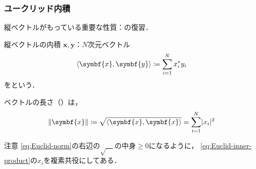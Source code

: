 \documentclass[
    10pt,
    ]{sotsu-beamer}
\begin{document}
\begin{frame}
    \frametitle{ユークリッド内積}

    縦ベクトルがもっている重要な性質：の復習．

    \pause 

    \begin{block}{縦ベクトルの内積}
        $\symbf{x}, \symbf{y}$：$N$次元ベクトル
        \begin{equation}
            \label{eq:Euclid-inner-product}
            \iparen{\symbf{x}, \symbf{y}}
                \coloneq \sum_{i=1}^{N} x_i^* y_i
        \end{equation}
        をという．
    \end{block}

    ベクトルの長さ（）は，
    \begin{equation}
        \label{eq:Euclid-norm}
        \norm{\symbf{x}} \coloneq \sqrt{\iparen{\symbf{x}, \symbf{x}}}
            = \sum_{i = 1}^{N} \abs{x_i}^2
    \end{equation}

    \begin{alertblock}{注意}
        \eqref{eq:Euclid-norm}の右辺の$\sqrt{\quad}$の中身$\geq 0$になるように，
        \eqref{eq:Euclid-inner-product}の$x_i$を複素共役にしてある．
    \end{alertblock}

\end{frame}
\end{document}
